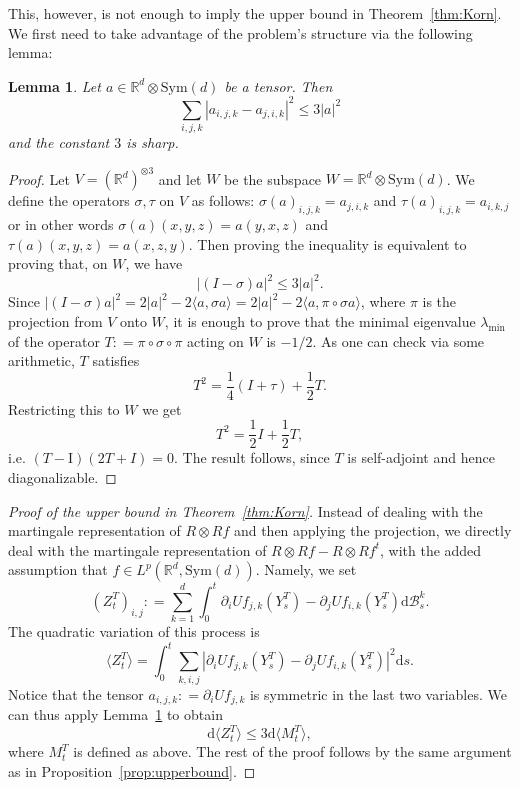 \documentclass[11pt, a4paper]{amsart}
\newtheorem{lemma}[theorem]{Lemma}
\theoremstyle{definition}
\theoremstyle{remark}
\newcommand{\R}{\mathbb{R}}
\begin{document}
This, however, is not enough to imply the upper bound
in Theorem~\ref{thm:Korn}. We first need to take
advantage of the problem's structure via
the following lemma:
\begin{lemma}\label{lemma:linalg1}
Let $a\in \R^d\otimes \mathrm{Sym}(d)$ be a tensor.
Then
\begin{equation*}
\sum_{i,j,k}|a_{i,j,k}-a_{j,i,k}|^2\le 3 |a|^2
\end{equation*}
and the constant $3$ is sharp.
\end{lemma}
\begin{proof}
Let $V=(\R^d)^{\otimes 3}$ and let $W$ be the subspace 
$W=\R^d\otimes \mathrm{Sym}(d)$.
We define the operators $\sigma, \tau$
on $V$ as follows: 
$\sigma(a)_{i,j,k}=a_{j,i,k}$ and 
$\tau(a)_{i,j,k}=a_{i,k,j}$ or
in other words $\sigma(a)(x,y,z)=a(y,x,z)$ and
$\tau(a)(x,y,z)=a(x,z,y)$. Then proving the
inequality is equivalent to proving that,
on $W$, we have
\begin{equation*}
|(I-\sigma)a|^2\le 3 |a|^2.
\end{equation*}
Since $|(I-\sigma)a|^2=2|a|^2-2\langle a,\sigma a\rangle
=2|a|^2-2\langle a, \pi\circ \sigma a\rangle$,
where $\pi$ is the projection from $V$ onto $W$,
it is enough to prove that the minimal eigenvalue
$\lambda_{\mathrm{min}}$ of the operator
$T\mathrel{:}=\pi\circ \sigma\circ \pi$
acting on $W$ is $-1/2$.
As one can check via some arithmetic, $T$ satisfies
\begin{equation*}
    T^2=\frac14(I+\tau)+\frac 12 T.
\end{equation*} Restricting this to $W$ we get
\begin{equation*}
    T^2=\frac 12 I +\frac 12 T,
\end{equation*}
i.e. $(T-\mathrm{I})(2T+I)=0$. The result follows,
since $T$ is self-adjoint and hence diagonalizable.
\end{proof}
\begin{proof}[Proof of the upper bound
in Theorem~\ref{thm:Korn}]
Instead of dealing with the martingale
representation of $R\otimes Rf$
and then applying the projection, we directly deal with
the martingale representation of
$R\otimes Rf-R\otimes Rf^t$,
with the added assumption that
$f\in L^p(\R^d, \mathrm{Sym}(d))$.
Namely, we set
\begin{equation*}
(Z^T_t)_{i,j}\mathrel{:}=
\sum_{k=1}^d \int_0^t \partial_i Uf_{j,k}(Y_s^T)-
\partial_j U f_{i,k}(Y^T_s)\mathrm d\mathcal B_s^k.
\end{equation*}
The quadratic variation of this process is
\begin{equation*}
\langle Z^T_t\rangle=
\int_0^t \sum_{k,i,j} |\partial_i Uf_{j,k}(Y_s^T)-
\partial_j U f_{i,k}(Y_s^T)|^2\mathrm ds.
\end{equation*}
Notice that the tensor
$a_{i,j,k}\mathrel{:}=\partial_i Uf_{j,k}$
is symmetric in the last two variables.
We can thus apply Lemma~\ref{lemma:linalg1}
to obtain
\begin{equation*}
\mathrm{d}\langle Z^T_t\rangle
\le 3 \mathrm{d}\langle M^T_t\rangle,
\end{equation*}
where $M^T_t$ is defined as above.
The rest of the proof follows by the same argument as in
Proposition~\ref{prop:upperbound}.
\end{proof}
\end{document}
